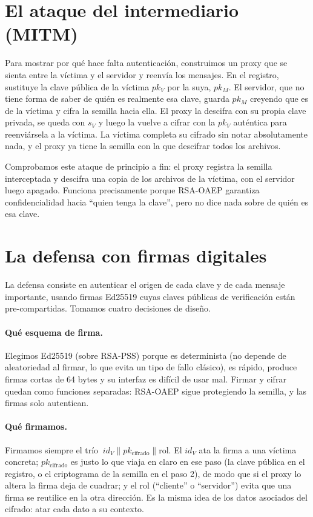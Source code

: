 \documentclass[11pt,a4paper]{article}
\begin{document}
\section{El ataque del intermediario (MITM)}

Para mostrar por qué hace falta autenticación, construimos un proxy que se sienta
entre la víctima y el servidor y reenvía los mensajes. En el registro, sustituye
la clave pública de la víctima $pk_V$ por la suya, $pk_M$. El servidor, que no
tiene forma de saber de quién es realmente esa clave, guarda $pk_M$ creyendo que
es de la víctima y cifra la semilla hacia ella. El proxy la descifra con su propia
clave privada, se queda con $s_V$ y luego la vuelve a cifrar con la $pk_V$
auténtica para reenviársela a la víctima. La víctima completa su cifrado sin notar
absolutamente nada, y el proxy ya tiene la semilla con la que descifrar todos los
archivos.

Comprobamos este ataque de principio a fin: el proxy registra la semilla
interceptada y descifra una copia de los archivos de la víctima, con el servidor
luego apagado. Funciona precisamente porque RSA-OAEP garantiza confidencialidad
hacia ``quien tenga la clave'', pero no dice nada sobre de quién es esa clave.

\section{La defensa con firmas digitales}

La defensa consiste en autenticar el origen de cada clave y de cada mensaje
importante, usando firmas Ed25519 cuyas claves públicas de verificación están
pre-compartidas. Tomamos cuatro decisiones de diseño.

\paragraph{Qué esquema de firma.} Elegimos Ed25519 (sobre RSA-PSS) porque es
determinista (no depende de aleatoriedad al firmar, lo que evita un tipo de fallo
clásico), es rápido, produce firmas cortas de 64 bytes y su interfaz es difícil de
usar mal. Firmar y cifrar quedan como funciones separadas: RSA-OAEP sigue
protegiendo la semilla, y las firmas solo autentican.

\paragraph{Qué firmamos.} Firmamos siempre el trío
$\ id_V \parallel pk_{\text{cifrado}} \parallel \text{rol}$. El $id_V$ ata la firma
a una víctima concreta; $pk_{\text{cifrado}}$ es justo lo que viaja en claro en ese
paso (la clave pública en el registro, o el criptograma de la semilla en el paso
2), de modo que si el proxy lo altera la firma deja de cuadrar; y el rol
(``cliente'' o ``servidor'') evita que una firma se reutilice en la otra
dirección. Es la misma idea de los datos asociados del cifrado: atar cada dato a
su contexto.
\end{document}
